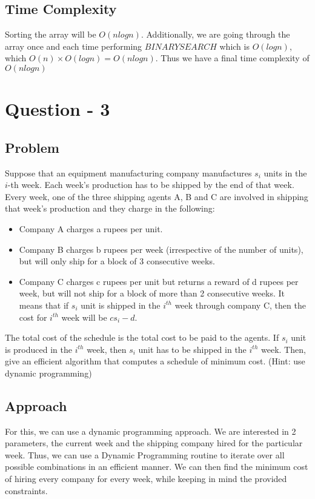 \documentclass{article}
\begin{document}
\subsection{Time Complexity}

Sorting the array will be $O(n log n)$. Additionally, we are going through the array once and each time performing $BINARYSEARCH$ which is $O(log n)$, which $O(n) \times O(log n) = O(n log n)$. Thus we have a final time complexity of $O(n log n)$

\section{Question - 3}

\subsection{Problem}

Suppose that an equipment manufacturing company manufactures $s_i$ units in the $i$-th week. Each week’s production has to be shipped by the end of that week. Every week, one of the three shipping agents A, B and C are involved in shipping that week’s production and they charge in the following:

\begin{itemize}
    \item Company A charges a rupees per unit.
    \item Company B charges b rupees per week (irrespective of the number of units), but will only ship for a block of 3 consecutive weeks.
    \item Company C charges c rupees per unit but returns a reward of d rupees per week, but will not ship for a block of more than 2 consecutive weeks. It means that if $s_i$ unit is shipped in the $i^{th}$ week through company C, then the cost for $i^{th}$ week will be $cs_i - d$.
\end{itemize}

The total cost of the schedule is the total cost to be paid to the agents. If $s_i$ unit is produced in the $i^{th}$ week, then $s_i$ unit has to be shipped in the $i^{th}$ week. Then, give an efficient algorithm that computes a schedule of minimum cost. (Hint: use dynamic programming)


\subsection{Approach}
For this, we can use a dynamic programming approach. We are interested in 2 parameters, the current week and the shipping company hired for the particular week. Thus, we can use a Dynamic Programming routine to iterate over all possible combinations in an efficient manner. We can then find the minimum cost of hiring every company for every week, while keeping in mind the provided constraints.
\end{document}

